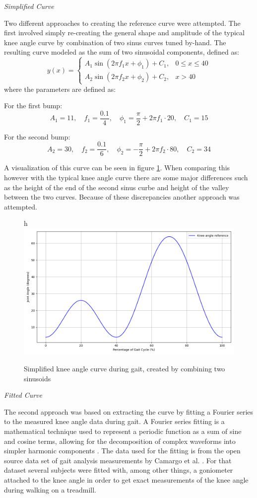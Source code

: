 \textit{Simplified Curve}

Two different approaches to creating the reference curve were attempted. The first involved simply re-creating the general shape and amplitude of the typical knee angle curve by combination of two sinus curves tuned by-hand. The resulting curve modeled as the sum of two sinusoidal components, defined as:
\[
y(x) =
\begin{cases}
A_1 \sin\left(2 \pi f_1 x + \phi_1\right) + C_1, & 0 \leq x \leq 40 \\
A_2 \sin\left(2 \pi f_2 x + \phi_2\right) + C_2, & x > 40
\end{cases}
\]
where the parameters are defined as:

For the first bump:
\[
A_1 = 11, \quad f_1 = \frac{0.1}{4}, \quad \phi_1 = \frac{\pi}{2} + 2\pi f_1 \cdot 20, \quad C_1 = 15
\]

For the second bump:
\[
A_2 = 30, \quad f_2 = \frac{0.1}{6}, \quad \phi_2 = -\frac{\pi}{2} + 2\pi f_2 \cdot 80, \quad C_2 = 34
\]

A visualization of this curve can be seen in figure \ref{fig:simplecurve}. When comparing this however with the typical knee angle curve there are some major differences such as the height of the end of the second sinus curbe and height of the valley between the two curves. Because of these discrepancies another approach was attempted.
\begin{figure} {h}
    \centering
    \includegraphics[width=0.8\linewidth]{images/simpleKneeAngle.png}
    \caption{Simplified knee angle curve during gait, created by combining two sinusoids}
    \label{fig:simplecurve}
\end{figure}
\newline

\textit{Fitted Curve}

The second approach was based on extracting the curve by fitting a Fourier series to the measured knee angle data during gait. A Fourier series fitting is a mathematical technique used to represent a periodic function as a sum of sine and cosine terms, allowing for the decomposition of complex waveforms into simpler harmonic components \cite{blackledget_chapter_2006}. The data used for the fitting is from the open source data set of gait analysis measurements by Camargo et al. \cite{camargo_comprehensive_2021}. For that dataset several subjects were fitted with, among other things, a goniometer attached to the knee angle in order to get exact measurements of the knee angle during walking on a treadmill. 

